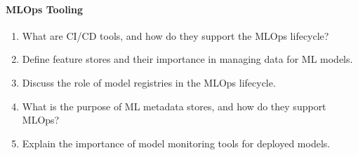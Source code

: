 \paragraph*{MLOps Tooling}
\begin{enumerate}
    \item What are CI/CD tools, and how do they support the MLOps lifecycle?
    \item Define feature stores and their importance in managing data for ML models.
    \item Discuss the role of model registries in the MLOps lifecycle.
    \item What is the purpose of ML metadata stores, and how do they support MLOps?
    \item Explain the importance of model monitoring tools for deployed models.
\end{enumerate}
